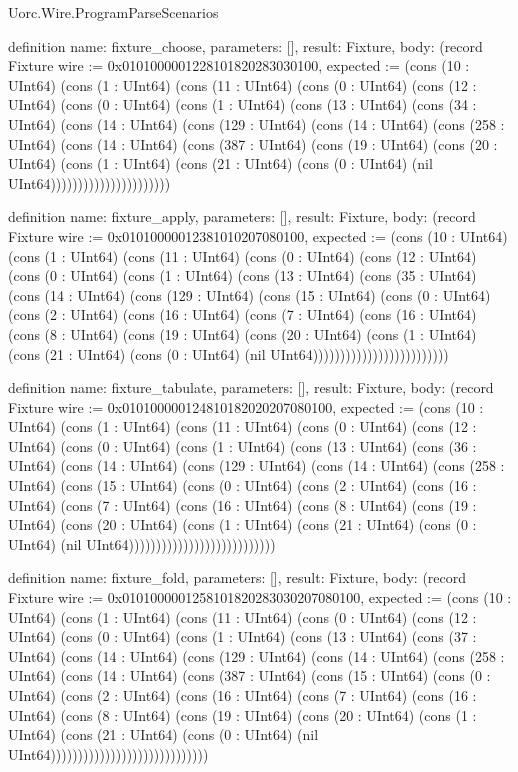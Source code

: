 \begin{lexlean}{Uorc.Wire.ProgramParseScenarios}
\begin{semanticmodule}
definition{
  name: fixture_choose,
  parameters: [],
  result: Fixture,
  body: (record Fixture {wire := 0x0101000001228101820283030100, expected := (cons (10 : UInt64) (cons (1 : UInt64) (cons (11 : UInt64) (cons (0 : UInt64) (cons (12 : UInt64) (cons (0 : UInt64) (cons (1 : UInt64) (cons (13 : UInt64) (cons (34 : UInt64) (cons (14 : UInt64) (cons (129 : UInt64) (cons (14 : UInt64) (cons (258 : UInt64) (cons (14 : UInt64) (cons (387 : UInt64) (cons (19 : UInt64) (cons (20 : UInt64) (cons (1 : UInt64) (cons (21 : UInt64) (cons (0 : UInt64) (nil UInt64)))))))))))))))))))))})
}

definition{
  name: fixture_apply,
  parameters: [],
  result: Fixture,
  body: (record Fixture {wire := 0x01010000012381010207080100, expected := (cons (10 : UInt64) (cons (1 : UInt64) (cons (11 : UInt64) (cons (0 : UInt64) (cons (12 : UInt64) (cons (0 : UInt64) (cons (1 : UInt64) (cons (13 : UInt64) (cons (35 : UInt64) (cons (14 : UInt64) (cons (129 : UInt64) (cons (15 : UInt64) (cons (0 : UInt64) (cons (2 : UInt64) (cons (16 : UInt64) (cons (7 : UInt64) (cons (16 : UInt64) (cons (8 : UInt64) (cons (19 : UInt64) (cons (20 : UInt64) (cons (1 : UInt64) (cons (21 : UInt64) (cons (0 : UInt64) (nil UInt64))))))))))))))))))))))))})
}

definition{
  name: fixture_tabulate,
  parameters: [],
  result: Fixture,
  body: (record Fixture {wire := 0x010100000124810182020207080100, expected := (cons (10 : UInt64) (cons (1 : UInt64) (cons (11 : UInt64) (cons (0 : UInt64) (cons (12 : UInt64) (cons (0 : UInt64) (cons (1 : UInt64) (cons (13 : UInt64) (cons (36 : UInt64) (cons (14 : UInt64) (cons (129 : UInt64) (cons (14 : UInt64) (cons (258 : UInt64) (cons (15 : UInt64) (cons (0 : UInt64) (cons (2 : UInt64) (cons (16 : UInt64) (cons (7 : UInt64) (cons (16 : UInt64) (cons (8 : UInt64) (cons (19 : UInt64) (cons (20 : UInt64) (cons (1 : UInt64) (cons (21 : UInt64) (cons (0 : UInt64) (nil UInt64))))))))))))))))))))))))))})
}

definition{
  name: fixture_fold,
  parameters: [],
  result: Fixture,
  body: (record Fixture {wire := 0x0101000001258101820283030207080100, expected := (cons (10 : UInt64) (cons (1 : UInt64) (cons (11 : UInt64) (cons (0 : UInt64) (cons (12 : UInt64) (cons (0 : UInt64) (cons (1 : UInt64) (cons (13 : UInt64) (cons (37 : UInt64) (cons (14 : UInt64) (cons (129 : UInt64) (cons (14 : UInt64) (cons (258 : UInt64) (cons (14 : UInt64) (cons (387 : UInt64) (cons (15 : UInt64) (cons (0 : UInt64) (cons (2 : UInt64) (cons (16 : UInt64) (cons (7 : UInt64) (cons (16 : UInt64) (cons (8 : UInt64) (cons (19 : UInt64) (cons (20 : UInt64) (cons (1 : UInt64) (cons (21 : UInt64) (cons (0 : UInt64) (nil UInt64))))))))))))))))))))))))))))})
}


\end{semanticmodule}
\end{lexlean}

